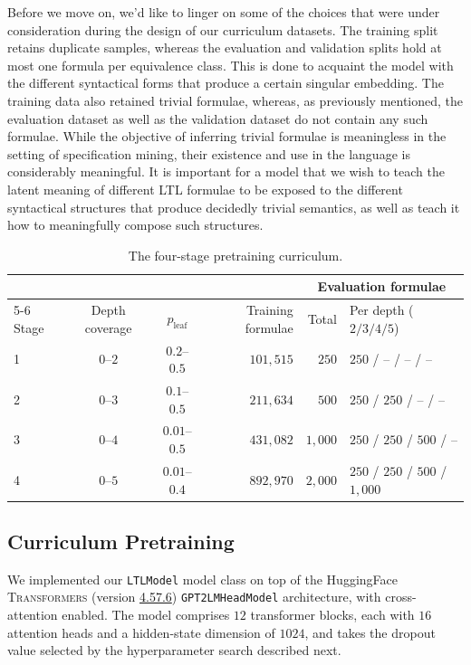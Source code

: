 \documentclass[titlepage,a4paper,11pt]{report}
\begin{document}
    Before we move on, we'd like to linger on some of the choices that were under consideration during the design of our curriculum datasets. The training split retains duplicate samples, whereas the evaluation and validation splits hold at most one formula per equivalence class. This is done to acquaint the model with the different syntactical forms that produce a certain singular embedding. The training data also retained trivial formulae, whereas, as previously mentioned, the evaluation dataset as well as the validation dataset do not contain any such formulae. While the objective of inferring trivial formulae is meaningless in the setting of specification mining, their existence and use in the language is considerably meaningful. It is important for a model that we wish to teach the latent meaning of different LTL formulae to be exposed to the different syntactical structures that produce decidedly trivial semantics, as well as teach it how to meaningfully compose such structures.
    
    \begin{table}[ht]
        \centering
        \caption{The four-stage pretraining curriculum.}
        \label{tab:curriculum}
        \begin{tabular}{lccrrl}
            \toprule
            & & & & \multicolumn{2}{c}{Evaluation formulae} \\
            \cmidrule(lr){5-6}
            Stage & Depth coverage & $p_{\text{leaf}}$ & Training formulae & Total & Per depth ($2/3/4/5$) \\
            \midrule
            1 & $0$--$2$ & $0.2$--$0.5$   & $101{,}515$ & $250$     & $250$ / -- / -- / -- \\
            2 & $0$--$3$ & $0.1$--$0.5$   & $211{,}634$ & $500$     & $250$ / $250$ / -- / -- \\
            3 & $0$--$4$ & $0.01$--$0.5$  & $431{,}082$ & $1{,}000$ & $250$ / $250$ / $500$ / -- \\
            4 & $0$--$5$ & $0.01$--$0.4$  & $892{,}970$ & $2{,}000$ & $250$ / $250$ / $500$ / $1{,}000$ \\
            \bottomrule
        \end{tabular}
    \end{table}
    
    \subsection{Curriculum Pretraining}\label{sec:curriculum_pretraining}
    We implemented our \texttt{LTLModel} model class on top of the HuggingFace \textsc{Transformers} (version \href{https://github.com/huggingface/transformers/tree/v4.57.6}{4.57.6}) \texttt{GPT2LMHeadModel} architecture, with cross-attention enabled. The model comprises $12$ transformer blocks, each with $16$ attention heads and a hidden-state dimension of $1024$, and takes the dropout value selected by the hyperparameter search described next.
    
\end{document}
